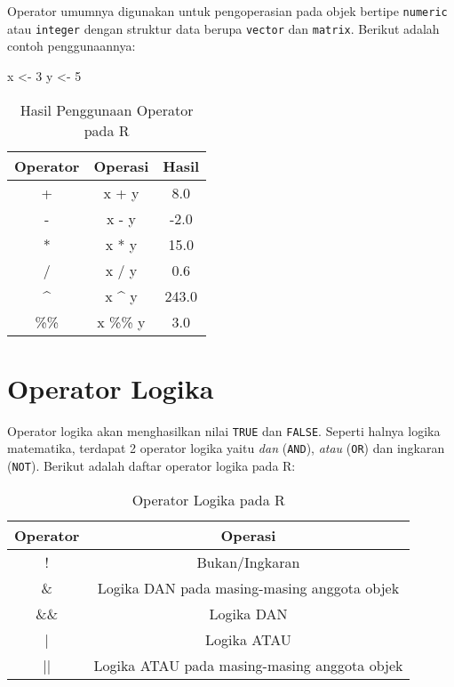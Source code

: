 \documentclass[
]{book}
\newenvironment{Shaded}{\begin{snugshade}}{\end{snugshade}}
\newcommand{\DecValTok}[1]{\textcolor[rgb]{0.00,0.00,0.81}{#1}}
\newcommand{\NormalTok}[1]{#1}
\newcommand{\StringTok}[1]{\textcolor[rgb]{0.31,0.60,0.02}{#1}}
\begin{document}
Operator umumnya digunakan untuk pengoperasian pada objek bertipe \texttt{numeric} atau \texttt{integer} dengan struktur data berupa \texttt{vector} dan \texttt{matrix}. Berikut adalah contoh penggunaannya:

\begin{Shaded}
\begin{Highlighting}[]
\NormalTok{x <-}\StringTok{ }\DecValTok{3}
\NormalTok{y <-}\StringTok{ }\DecValTok{5}
\end{Highlighting}
\end{Shaded}

\begin{table}

\caption{\label{tab:unnamed-chunk-25}Hasil Penggunaan Operator pada R}
\centering
\begin{tabular}[t]{ccc}
\toprule
Operator & Operasi & Hasil\\
\midrule
+ & x + y & 8.0\\
- & x - y & -2.0\\
* & x * y & 15.0\\
/ & x / y & 0.6\\
\textasciicircum{} & x \textasciicircum{} y & 243.0\\
\addlinespace
\%\% & x \%\% y & 3.0\\
\bottomrule
\end{tabular}
\end{table}

\hypertarget{operator-logika}{%
\section{Operator Logika}\label{operator-logika}}

Operator logika akan menghasilkan nilai \texttt{TRUE} dan \texttt{FALSE}. Seperti halnya logika matematika, terdapat 2 operator logika yaitu \emph{dan} (\texttt{AND}), \emph{atau} (\texttt{OR}) dan ingkaran (\texttt{NOT}). Berikut adalah daftar operator logika pada R:

\begin{table}

\caption{\label{tab:unnamed-chunk-26}Operator Logika pada R}
\centering
\begin{tabular}[t]{cc}
\toprule
Operator & Operasi\\
\midrule
! & Bukan/Ingkaran\\
\& & Logika DAN pada masing-masing anggota objek\\
\&\& & Logika DAN\\
| & Logika ATAU\\
|| & Logika ATAU pada masing-masing anggota objek\\
\bottomrule
\end{tabular}
\end{table}
\end{document}
